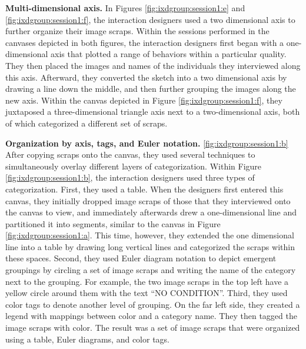 \textbf{Multi-dimensional axis.} In Figures \ref{fig:ixdgroup:session1:e} and \ref{fig:ixdgroup:session1:f}, the interaction designers used a two dimensional axis to further organize their image scraps. Within the sessions performed in the canvases depicted in both figures, the interaction designers first began with a one-dimensional axis that plotted a range of behaviors within a particular quality. They then placed the images and names of the individuals they interviewed along this axis. Afterward, they converted the sketch into a two dimensional axis by drawing a line down the middle, and then further grouping the images along the new axis. Within the canvas depicted in Figure \ref{fig:ixdgroup:session1:f}, they juxtaposed a three-dimensional triangle axis next to a two-dimensional axis, both of which categorized a different set of scraps.

\textbf{Organization by axis, tags, and Euler notation.} \ref{fig:ixdgroup:session1:b} After copying scraps onto the canvas, they used several techniques to simultaneously overlay  different layers of categorization. Within Figure \ref{fig:ixdgroup:session1:b}, the interaction designers used three types of categorization. First, they used a table. When the designers first entered this canvas, they initially dropped image scraps of those that they interviewed onto the canvas to view, and immediately afterwards drew a one-dimensional line and partitioned it into segments, similar to the canvas in Figure \ref{fig:ixdgroup:session1:a}. This time, however, they extended the one dimensional line into a table by drawing long vertical lines and categorized the scraps within these spaces. Second, they used Euler diagram notation to depict emergent groupings by circling a set of image scraps and writing the name of the category next to the grouping. For example, the two image scraps in the top left have a yellow circle around them with the text ``NO CONDITION''. Third, they used color tags to denote another level of grouping. On the far left side, they created a legend with mappings between color and a category name. They then tagged the image scraps with color. The result was a set of image scraps that were organized using a table, Euler diagrams, and color tags.


